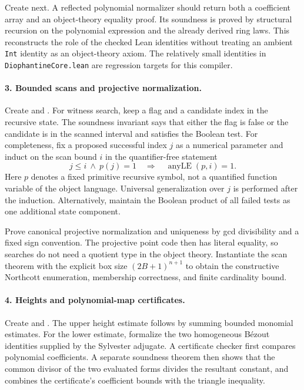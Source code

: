 Create  next.  A reflected
polynomial normalizer should return both a coefficient array and an
object-theory equality proof.  Its soundness is proved by structural
recursion on the polynomial expression and the already derived ring
laws.  This reconstructs the role of the checked Lean identities without
treating an ambient \texttt{Int} identity as an object-theory axiom.
The relatively small identities in \texttt{DiophantineCore.lean} are
regression targets for this compiler.

\paragraph{3. Bounded scans and projective normalization.}
Create  and .
For witness search, keep a flag and a candidate index in the recursive
state.  The soundness invariant says that either the flag is false or the
candidate is in the scanned interval and satisfies the Boolean test.
For completeness, fix a proposed successful index $j$ as a numerical
parameter and induct on the scan bound $i$ in the quantifier-free
statement
\[
 j\leq i\ \wedge\ p(j)=1\quad\Longrightarrow\quad
 \operatorname{anyLE}(p,i)=1.
\]
Here $p$ denotes a fixed primitive recursive symbol, not a quantified
function variable of the object language.  Universal generalization over
$j$ is performed after the induction.  Alternatively, maintain the
Boolean product of all failed tests as one additional state component.

Prove canonical projective normalization and uniqueness by gcd
divisibility and a fixed sign convention.  The projective point code
then has literal equality, so searches do not need a quotient type in
the object theory.  Instantiate the scan theorem with the explicit box
size $(2B+1)^{n+1}$ to obtain the constructive Northcott enumeration,
membership correctness, and finite cardinality bound.

\paragraph{4. Heights and polynomial-map certificates.}
Create  and .
The upper height estimate follows by summing bounded monomial estimates.
For the lower estimate, formalize the two homogeneous B\'ezout
identities supplied by the Sylvester adjugate.  A certificate checker
first compares polynomial coefficients.  A separate soundness theorem
then shows that the common divisor of the two evaluated forms divides
the resultant constant, and combines the certificate's coefficient
bounds with the triangle inequality.

